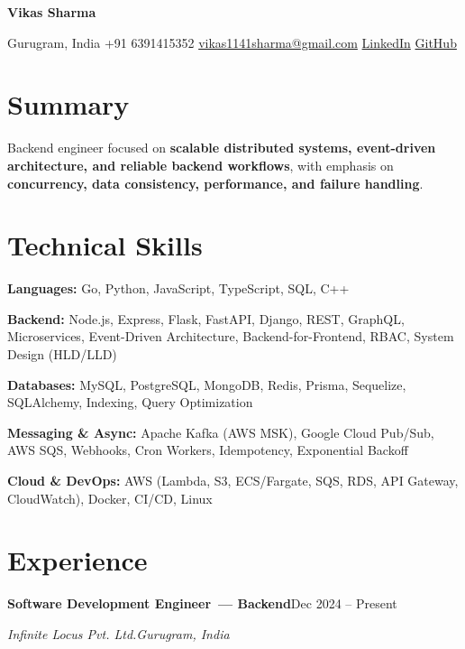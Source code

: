 \documentclass[10pt,a4paper]{article}
\newcommand{\sep}{\;\textbar\;}
\newcommand{\skill}[2]{\textbf{#1:} #2\par\vspace{0.4pt}}
\newcommand{\jobheading}[4]{%
  \vspace{1pt}
  {\textbf{\large #1}\hfill #2\par}
  {\itshape #3\sep#4\par}
  \vspace{1pt}}
\begin{document}
\begingroup\centering
  {\fontsize{20}{23}\selectfont\bfseries\spaceskip=0pt\relax Vikas Sharma\par}
  \vspace{4pt}
  {\small
    Gurugram, India\sep%
    +91 6391415352\sep%
    \href{mailto:vikas1141sharma@gmail.com}{vikas1141sharma@gmail.com}\sep%
    \href{https://www.linkedin.com/in/vikas-sharma-321055224}{LinkedIn}\sep%
    \href{https://github.com/vikas107sharma}{GitHub}\par}
\endgroup

\section{Summary}
Backend engineer focused on \textbf{scalable distributed systems, event-driven architecture, and reliable backend workflows}, with emphasis on \textbf{concurrency, data consistency, performance, and failure handling}.

\section{Technical Skills}
\skill{Languages}{Go, Python, JavaScript, TypeScript, SQL, C++}
\skill{Backend}{Node.js, Express, Flask, FastAPI, Django, REST, GraphQL, Microservices, Event-Driven Architecture, Backend-for-Frontend, RBAC, System Design (HLD/LLD)}
\skill{Databases}{MySQL, PostgreSQL, MongoDB, Redis, Prisma, Sequelize, SQLAlchemy, Indexing, Query Optimization}
\skill{Messaging \& Async}{Apache Kafka (AWS MSK), Google Cloud Pub/Sub, AWS SQS, Webhooks, Cron Workers, Idempotency, Exponential Backoff}
\skill{Cloud \& DevOps}{AWS (Lambda, S3, ECS/Fargate, SQS, RDS, API Gateway, CloudWatch), Docker, CI/CD, Linux}

\section{Experience}
\jobheading{Software Development Engineer~--- Backend}{Dec 2024 -- Present}{Infinite Locus Pvt. Ltd.}{Gurugram, India}
\end{document}
